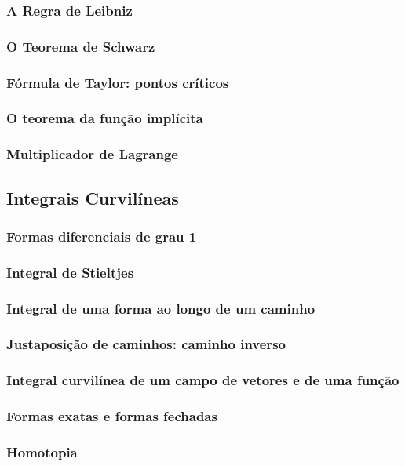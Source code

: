 \documentclass{article}
\theoremstyle{plain}
\theoremstyle{definition}
\theoremstyle{remark}
\begin{document}
   \subsubsection{A Regra de Leibniz}
   \subsubsection{O Teorema de Schwarz}
   \subsubsection{Fórmula de Taylor: pontos críticos}
   \subsubsection{O teorema da função implícita}
   \subsubsection{ Multiplicador de Lagrange}
\subsection{ Integrais Curvilíneas}
   \subsubsection{Formas diferenciais de grau 1}
   \subsubsection{Integral de Stieltjes}
   \subsubsection{Integral de uma forma ao longo de um caminho}
   \subsubsection{Justaposição de caminhos: caminho inverso}
   \subsubsection{Integral curvilínea de um campo de vetores e de uma função}
   \subsubsection{Formas exatas e formas fechadas}
   \subsubsection{Homotopia}
\end{document}
